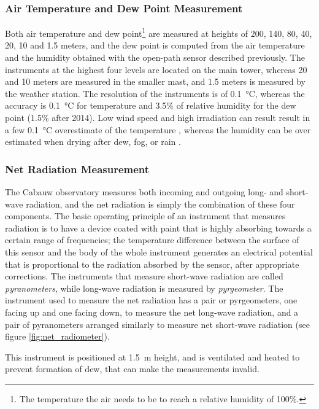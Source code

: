 \documentclass[a4paper,11pt]{kth-mag}
\begin{document}
\subsubsection{Air Temperature and Dew Point Measurement}
Both air temperature and dew point\footnote{The temperature the air needs to be to reach a relative humidity of 100\%.} are measured at heights of 200, 140, 80, 40, 20, 10 and 1.5 meters, and the dew point is computed from the air temperature and the humidity obtained with the open-path sensor described previously. The instruments at the highest four levels are located on the main tower, whereas 20 and 10 meters are measured in the smaller mast, and 1.5 meters is measured by the weather station. The resolution of the instruments is of \SI{0.1}{\celsius}, whereas the accuracy is \SI{0.1}{\celsius} for temperature and 3.5\% of relative humidity for the dew point (1.5\% after 2014). Low wind speed and high irradiation can result result in a few \SI{0.1}{\celsius} overestimate of the temperature \citep{tempoverestimate}, whereas the humidity can be over estimated when drying after dew, fog, or rain \citep{cabauwinsitu}.



\subsubsection{Net Radiation Measurement}
The Cabauw observatory measures both incoming and outgoing long- and short-wave radiation, and the net radiation is simply the combination of these four components. The basic operating principle of an instrument that measures radiation is to have a device coated with paint that is highly absorbing towards a certain range of frequencies; the temperature difference between the surface of this sensor and the body of the whole instrument generates an electrical potential that is proportional to the radiation absorbed by the sensor, after appropriate corrections.  The instruments that measure short-wave radiation are called \emph{pyranometers}, while long-wave radiation is measured by \emph{pyrgeometer}.  The instrument used to measure the net radiation has a pair or pyrgeometers, one facing up and one facing down, to measure the net long-wave radiation, and a pair of pyranometers arranged similarly to measure net short-wave radiation (see figure \ref{fig:net_radiometer}).

This instrument is positioned at \SI{1.5}{\meter} height, and is ventilated and heated to prevent formation of dew, that can make the measurements invalid.
\end{document}
